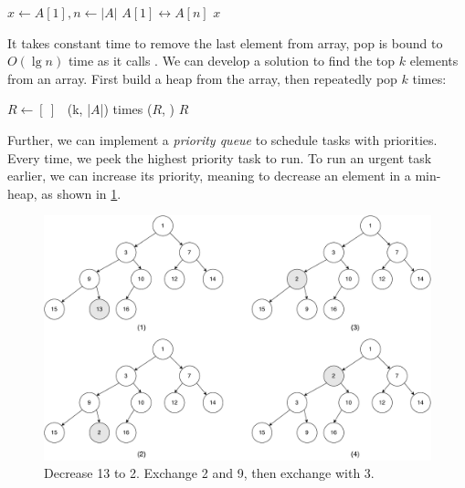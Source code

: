 \documentclass[b5paper]{article}
\begin{document}
\begin{algorithmic}[1]
  \State $x \gets A [1], n \gets |A|$
  \State {} $A[1] \leftrightarrow A[n]$
  \State {}
    \State {}
  \EndIf
  \State \Return $x$
\EndFunction
\end{algorithmic}

It takes constant time to remove the last element from array, pop is bound to $O(\lg n)$ time as it calls . We can develop a solution to find the top $k$ elements from an array. First build a heap from the array, then repeatedly pop $k$ times:

\begin{algorithmic}[1]
  \State $R \gets [\ ]$
  \State {}
  \Loop \ (k, |$A$|) times 
    \State {}($R$, )
  \EndLoop
  \State \Return $R$
\EndFunction
\end{algorithmic}

Further, we can implement a {\em priority queue} to schedule tasks with priorities. Every time, we peek the highest priority task to run. To run an urgent task earlier, we can increase its priority, meaning to decrease an element in a min-heap, as shown in \cref{fig:decrease-key-2}.

\begin{figure}[htbp]
  \centering
  \includegraphics[scale=0.4]{img/decrease-key}
  \caption{Decrease 13 to 2. Exchange 2 and 9, then exchange with 3.}
  \label{fig:decrease-key-2}
\end{figure}
\end{document}
